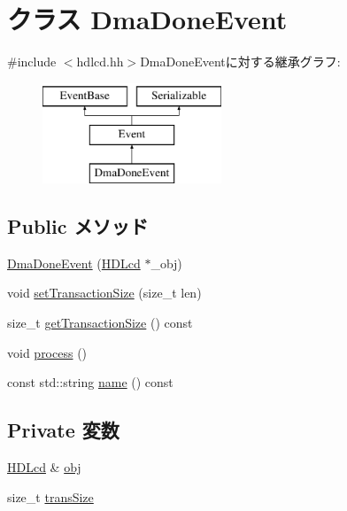 \hypertarget{classHDLcd_1_1DmaDoneEvent}{
\section{クラス DmaDoneEvent}
\label{classHDLcd_1_1DmaDoneEvent}
}


{\ttfamily \#include $<$hdlcd.hh$>$}DmaDoneEventに対する継承グラフ:\begin{figure}[H]
\begin{center}
\leavevmode
\includegraphics[height=3cm]{classHDLcd_1_1DmaDoneEvent}
\end{center}
\end{figure}
\subsection*{Public メソッド}
\begin{DoxyCompactItemize}
\item 
\hyperlink{classHDLcd_1_1DmaDoneEvent_a4acb43ff14cf95fdb8b82edab387d481}{DmaDoneEvent} (\hyperlink{classHDLcd}{HDLcd} $\ast$\_\-obj)
\item 
void \hyperlink{classHDLcd_1_1DmaDoneEvent_a12d27d2abd590125ec6c776106e001da}{setTransactionSize} (size\_\-t len)
\item 
size\_\-t \hyperlink{classHDLcd_1_1DmaDoneEvent_a356e84d2c44afe22a5887853711ff2a2}{getTransactionSize} () const 
\item 
void \hyperlink{classHDLcd_1_1DmaDoneEvent_a2e9c5136d19b1a95fc427e0852deab5c}{process} ()
\item 
const std::string \hyperlink{classHDLcd_1_1DmaDoneEvent_a6490f765a824ced1cc94979609fe7e07}{name} () const 
\end{DoxyCompactItemize}
\subsection*{Private 変数}
\begin{DoxyCompactItemize}
\item 
\hyperlink{classHDLcd}{HDLcd} \& \hyperlink{classHDLcd_1_1DmaDoneEvent_a7f03e9152bceeb627cf7ecd2ce94781a}{obj}
\item 
size\_\-t \hyperlink{classHDLcd_1_1DmaDoneEvent_a2f0f49b234af2515eee766ba335f7dc3}{transSize}
\end{DoxyCompactItemize}


